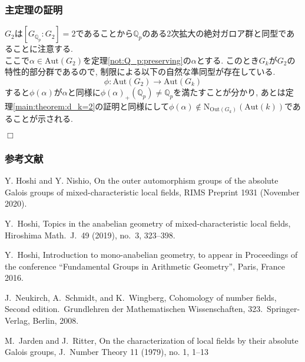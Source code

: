 \documentclass[dvipdfmx,19.8pt]{beamer}
\def\qed{\hfill $\Box$}
\theoremstyle{theorem}
\theoremstyle{definition}
\def\bQ{{\mathbb Q}}
\def\Aut{{\mathrm{Aut}}}
\def\Out{{\mathrm{Out}}}
\begin{document}
\begin{frame}[fragile]
	\frametitle{主定理の証明}
$G_2$は$[G_{\bQ_p}:G_2]=2$であることから$\bQ_p$のある2次拡大の絶対ガロア群と同型であることに注意する. \\



ここで$\alpha \in \Aut(G_2)$を定理\ref{not:Q_p:preserving}の$\alpha$とする. このとき$G_k$が$G_2$の特性的部分群であるので, 制限による以下の自然な準同型が存在している. 
\[
\phi \colon \Aut(G_2) \rightarrow \Aut(G_k)
\]
すると$\phi(\alpha)$が$\alpha$と同様に$\phi(\alpha)_+(\bQ_p) \neq \bQ_p$を満たすことが分かり, あとは定理\ref{main:theorem:d_k=2}の証明と同様にして$\phi(\alpha) \notin \mathrm{N}_{\Out(G_k)}(\Aut(k))$であることが示される. 

\qed

\end{frame}






























\frame
{
	\frametitle{参考文献}
    
    \begin{thebibliography}{99}

Y. Hoshi and Y. Nishio, 
On the outer automorphism groups of the absolute Galois groups of mixed-characteristic local fields,
RIMS Preprint 1931 (November 2020).  

Y.\ Hoshi, Topics in the anabelian geometry of mixed-characteristic local fields, Hiroshima Math.\ J.\ 49 (2019), no.\ 3, 323–398.


Y.\ Hoshi, Introduction to mono-anabelian geometry, to appear in Proceedings of the conference ``Fundamental Groups in Arithmetic Geometry'', Paris, France 2016.


J.\ Neukirch, A.\ Schmidt, and K.\ Wingberg, Cohomology of number fields, Second edition.\
Grundlehren der Mathematischen Wissenschaften, 323.\ Springer-Verlag, Berlin, 2008.


M.\ Jarden and J.\ Ritter, On the characterization of local fields by their absolute Galois
groups, J.\ Number Theory 11 (1979), no. 1, 1–13


\end{thebibliography}

}
\end{document}
